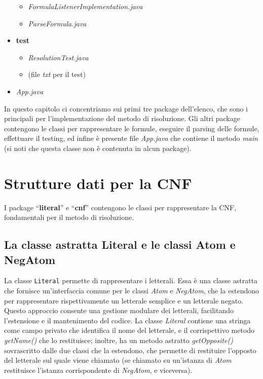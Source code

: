 \documentclass[a4paper,12pt]{report}
\begin{document}
\begin{itemize}
\begin{itemize}
            \item \textit{FormulaListenerImplementation.java}
            \item \textit{ParseFormula.java}
        \end{itemize}
    \item \textbf{test}
        \begin{itemize}
            \item \textit{ResolutionTest.java}
            \item (file \textit{txt} per il test)
        \end{itemize}
    \item \textit{App.java}
\end{itemize}
In questo capitolo ci concentriamo sui primi tre package dell'elenco, che sono i principali per l'implementazione del metodo di risoluzione. Gli altri package contengono le classi per rappresentare le formule, eseguire il parsing delle formule, effettuare il testing, ed infine è presente file \textit{App.java} che contiene il metodo \textit{main} (si noti che questa classe non è contenuta in alcun package).


\section{Strutture dati per la CNF}
I package ``\textbf{literal}'' e ``\textbf{cnf}'' contengono le classi per rappresentare la CNF, fondamentali per il metodo di risoluzione.

\subsection{La classe astratta Literal e le classi Atom e NegAtom}
La classe \texttt{Literal} permette di rappresentare i letterali. Essa è una classe astratta che fornisce un'interfaccia comune per le classi \textit{Atom} e \textit{NegAtom}, che la estendono per rappresentare rispettivamente un letterale semplice e un letterale negato. Questo approccio consente una gestione modulare dei letterali, facilitando l'estensione e il mantenimento del codice. La classe \textit{Literal} contiene una stringa come campo privato che identifica il nome del letterale, e il corrispettivo metodo \textit{getName()} che lo restituisce; inoltre, ha un metodo astratto \textit{getOpposite()} sovrascritto dalle due classi che la estendono, che permette di restituire l'opposto del letterale sul quale viene chiamato (se chiamato su un'istanza di \textit{Atom} restituisce l'istanza corrispondente di \textit{NegAtom}, e viceversa).
\end{document}
